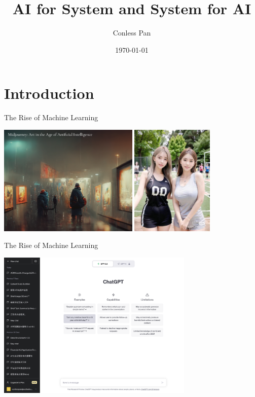 \documentclass[UTF8]{ctexbeamer}
\title{AI for System and System for AI}
\author{Conless Pan}
\date{\today}
\begin{document}
\begin{frame}[plain]
  \titlepage
\end{frame}

\begin{frame}
  \tableofcontents
\end{frame}

\section{Introduction}

\begin{frame}{The Rise of Machine Learning}
  \begin{center} 
    \includegraphics[height=150pt]{figure/midjourney_home.png} 
    \includegraphics[height=150pt]{figure/ai_pic.jpg} 
  \end{center}  
\end{frame}

\begin{frame}{The Rise of Machine Learning}
  \begin{center}
    \includegraphics[height=200pt]{figure/chatgpt.png}
  \end{center}
\end{frame}
\end{document}

